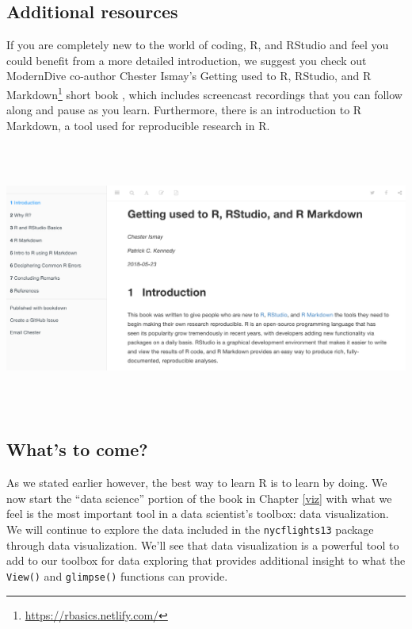 \documentclass[12pt, krantz2,]{krantz}
\renewcommand{\href}[2]{#2\footnote{\url{#1}}}
\begin{document}
\hypertarget{additional-resources}{%
\subsection{Additional resources}\label{additional-resources}}

If you are completely new to the world of coding, R, and RStudio and feel you could benefit from a more detailed introduction, we suggest you check out ModernDive co-author Chester Ismay's \href{https://rbasics.netlify.com/}{Getting used to R, RStudio, and R Markdown} short book \citep{usedtor2016}, which includes screencast recordings that you can follow along and pause as you learn. Furthermore, there is an introduction to R Markdown, a tool used for reproducible research in R.

\includegraphics[width=\textwidth,height=3.5in]{images/gettting-used-to-R.png}

\hypertarget{whats-to-come}{%
\subsection{What's to come?}\label{whats-to-come}}

As we stated earlier however, the best way to learn R is to learn by doing. We now start the ``data science'' portion of the book in Chapter \ref{viz} with what we feel is the most important tool in a data scientist's toolbox: data visualization. We will continue to explore the data included in the \texttt{nycflights13} package through data visualization. We'll see that data visualization is a powerful tool to add to our toolbox for data exploring that provides additional insight to what the \texttt{View()} and \texttt{glimpse()} functions can provide.
\end{document}
